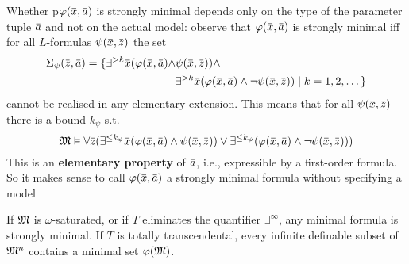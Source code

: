 \documentclass[11pt]{article}
\begin{document}
Whether p\(\varphi(\barx,\bara)\) is strongly minimal depends only on the type of the parameter
tuple \(\bara\) and not on the actual model: observe that \(\varphi(\barx,\bara)\) is strongly minimal
iff for all \(L\)-formulas \(\psi(\barx,\barz)\) the set
\begin{align*}
\Sigma_\psi(\barz,\bara)=\{\exists^{>k}\barx(\varphi(\barx,\bara)\wedge&\psi(\barx,\barz))\wedge\\
&\exists^{>k}\barx(\varphi(\barx,\bara)\wedge\neg\psi(\barx,\barz))\mid k=1,2,\dots\}
\end{align*}
cannot be realised in any elementary extension. This means that for all \(\psi(\barx,\barz)\) there
is a bound \(k_\psi\) s.t.
\begin{equation*}
\fM\vDash\forall\barz(\exists^{\le k_\psi}\barx(\varphi(\barx,\bara)\wedge\psi(\barx,\barz))\vee\exists^{\le k_\psi}(\varphi(\barx,\bara)\wedge\neg\psi(\barx,\barz)))
\end{equation*}
This is an \textbf{elementary property} of \(\bara\), i.e., expressible by a first-order formula. So it
makes sense to call \(\varphi(\barx,\bara)\) a strongly minimal formula without specifying a model


\begin{lemma}[]
\label{lemma5.7.2}
If \(\mathfrak{M}\) is \(\omega\)-saturated, or if \(T\) eliminates the quantifier \(\exists^\infty\), any minimal formula is
strongly minimal. If \(T\) is totally transcendental, every infinite definable subset of \(\mathfrak{M}^n\)
contains a minimal set \(\varphi(\mathfrak{M})\).
\end{lemma}
\end{document}

